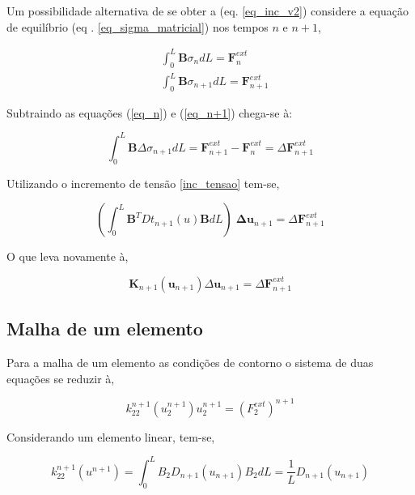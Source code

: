 \documentclass[12pt,a4paper]{article}
\newcommand{\diff}[1]{d#1}
\begin{document}
Um possibilidade alternativa de se obter a (eq. \ref{eq_inc_v2}) considere a equação de equilíbrio (eq . \ref{eq_sigma_matricial}) nos tempos $n$ e $n+1$,

\begin{align}
&\int_0^L \mathbf{B} \sigma_n \diff{L}  = \mathbf{F}^{ext}_n \label{eq_n}\\
&\int_0^L \mathbf{B} \sigma_{n+1} \diff{L}  = \mathbf{F}^{ext}_{n+1} \label{eq_n+1}
\end{align}
 
Subtraindo as equações (\ref{eq_n}) e (\ref{eq_n+1}) chega-se à:

\begin{equation}
\int_0^L \mathbf{B} \Delta \sigma_{n+1} \diff{L}  = \mathbf{F}^{ext}_{n+1} - \mathbf{F}^{ext}_n = \Delta\mathbf{F}^{ext}_{n+1}
\end{equation}

Utilizando o incremento de tensão \ref{inc_tensao} tem-se,

\begin{equation}
\left(\int_0^L \mathbf{B}^T Dt_{n+1}\left(u\right) \mathbf{B} \diff{L}\right) \; \mathbf{\Delta u}_{n+1} = \Delta\mathbf{F}^{ext}_{n+1}
\end{equation}

\noindent 

O que leva novamente à,

\begin{equation}
\mathbf{K}_{n+1}(\mathbf{u}_{n+1}) \Delta \mathbf{u}_{n+1} = \Delta \mathbf{F}^{ext}_{n+1} 
\label{eq_inc_v3}
\end{equation}

\subsection{Malha de um elemento}

Para a malha de um elemento as condições de contorno o sistema de duas equações se reduzir à,

\begin{equation}
k^{n+1}_{22}(u^{n+1}_2) u^{n+1}_2 = (F^{ext}_2)^{n+1}
\end{equation}

Considerando um elemento linear, tem-se, 

\begin{equation}
k^{n+1}_{22}(u^{n+1}) = \int_0^L B_2 D_{n+1}\left(u_{n+1}\right) B_2 \diff{L} = \frac{1}{L} D_{n+1}\left(u_{n+1}\right)
\end{equation}
\end{document}
